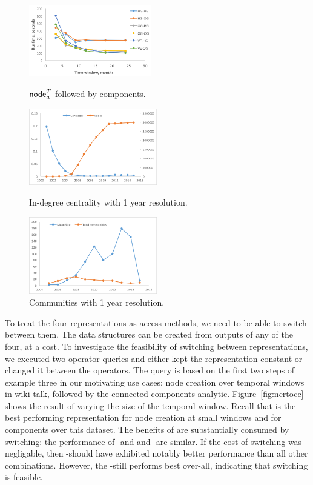 \begin{figure}[t]
\centering
\begin{minipage}{2.2in}
\centering
\includegraphics[width=2.1in]{figs/switch_cc.png}
\caption{$\textsf{node}^T_a$ followed by components.}
\label{fig:ncrtocc}
\vspace{-0.1in}
\end{minipage}
\begin{minipage}{2.2in}
\includegraphics[width=2.2in]{figs/centrality.png}
\caption{In-degree centrality with 1 year resolution.}
\label{fig:central}
\end{minipage}
\begin{minipage}{2.2in}
\includegraphics[width=2.2in]{figs/communities.png}
\caption{Communities with 1 year resolution.}
\label{fig:commun}
\end{minipage}
\end{figure}

To treat the four representations as access methods, we need to be
able to switch between them.  The data structures can be created from
outputs of any of the four, at a cost.  To investigate the feasibility
of switching between representations, we executed two-operator queries
and either kept the representation constant or changed it between the
operators.  The query is based on the first two steps of example three
in our motivating use cases: node creation over temporal windows in
wiki-talk, followed by the connected components analytic.
Figure~\ref{fig:ncrtocc} shows the result of varying the size of the
temporal window.  Recall that \og is the best performing
representation for node creation at small windows and \hg for
components over this dataset.  The benefits of \hg are substantially
consumed by switching: the performance of \og-\og and and \og-\hg are
similar.  If the cost of switching was negligable, then \og-\hg should
have exhibited notably better performance than all other combinations.
However, the \og-\hg still performs best over-all, indicating that
switching is feasible.

